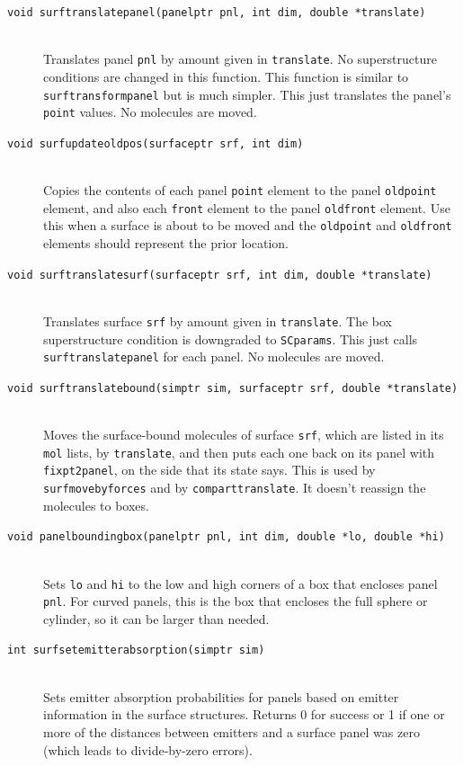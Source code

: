 \documentclass {scrbook}
\newcommand {\ttt} {\texttt}
\begin{document}
\begin{description}
\item[\ttt{void surftranslatepanel(panelptr pnl, int dim, double *translate)}]
\hfill \\
Translates panel \ttt{pnl} by amount given in \ttt{translate}. No superstructure conditions are changed in this function. This function is similar to \ttt{surftransformpanel} but is much simpler. This just translates the panel's \ttt{point} values. No molecules are moved.

\item[\ttt{void surfupdateoldpos(surfaceptr srf, int dim)}]
\hfill \\
Copies the contents of each panel \ttt{point} element to the panel \ttt{oldpoint} element, and also each \ttt{front} element to the panel \ttt{oldfront} element. Use this when a surface is about to be moved and the \ttt{oldpoint} and \ttt{oldfront} elements should represent the prior location.

\item[\ttt{void surftranslatesurf(surfaceptr srf, int dim, double *translate)}]
\hfill \\
Translates surface \ttt{srf} by amount given in \ttt{translate}. The box superstructure condition is downgraded to \ttt{SCparams}. This just calls \ttt{surftranslatepanel} for each panel. No molecules are moved.

\item[\ttt{void surftranslatebound(simptr sim, surfaceptr srf, double *translate)}]
\hfill \\
Moves the surface-bound molecules of surface \ttt{srf}, which are listed in its \ttt{mol} lists, by \ttt{translate}, and then puts each one back on its panel with \ttt{fixpt2panel}, on the side that its state says. This is used by \ttt{surfmovebyforces} and by \ttt{comparttranslate}. It doesn't reassign the molecules to boxes.

\item[\ttt{void panelboundingbox(panelptr pnl, int dim, double *lo, double *hi)}]
\hfill \\
Sets \ttt{lo} and \ttt{hi} to the low and high corners of a box that encloses panel \ttt{pnl}. For curved panels, this is the box that encloses the full sphere or cylinder, so it can be larger than needed.

\item[\ttt{int surfsetemitterabsorption(simptr sim)}]
\hfill \\
Sets emitter absorption probabilities for panels based on emitter information in the surface structures. Returns 0 for success or 1 if one or more of the distances between emitters and a surface panel was zero (which leads to divide-by-zero errors).


\end{description}
\end{document}
